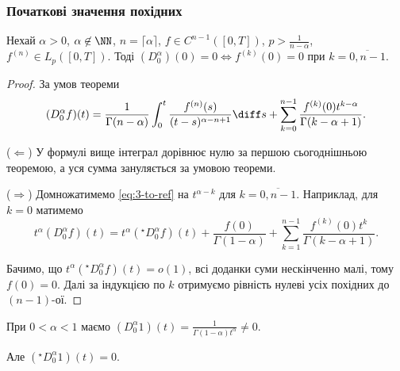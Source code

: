 \subsubsection{Початкові значення похідних}

\begin{theorem}
    Нехай $\alpha > 0$, $\alpha \not\in \NN$, $n = \lceil \alpha \rceil$, $f \in C^{n - 1}([0, T])$, $p > \frac{1}{n - \alpha}$, $f^{(n)} \in L_p([0, T])$. Тоді $(D_0^\alpha) (0) = 0 \iff f^{(k)} (0) = 0$ при $k = \overline{0, n - 1}$.
\end{theorem}

\begin{proof}
    За умов теореми
    \begin{equation}
        \label{eq:3-to-ref}
        (D_0^\alpha f)(t) = \frac{1}{\Gamma(n - \alpha)} \int_0^t \frac{f^{(n)}(s)}{(t - s)^{\alpha - n + 1}} \diff s + \sum_{k = 0}^{n - 1} \frac{f^{(k)}(0) t^{k - \alpha}}{\Gamma(k - \alpha + 1)}.
    \end{equation}

    ($\Longleftarrow$) У формулі вище інтеграл дорівнює нулю за першою сьогоднішньою теоремою, а уся сумма зануляється за умовою теореми. \medskip

    ($\Longrightarrow$) Домножатимемо \eqref{eq:3-to-ref} на $t^{\alpha - k}$ для $k = \overline{0, n - 1}$. Наприклад, для $k = 0$ матимемо
    \begin{equation}
        t^\alpha (D_0^\alpha f)(t) = t^\alpha ({}^\star D_0^\alpha f)(t) + \frac{f(0)}{\Gamma(1 - \alpha)} + \sum_{k = 1}^{n - 1} \frac{f^{(k)}(0) t^k}{\Gamma(k - \alpha + 1)}.
    \end{equation}

    Бачимо, що $t^\alpha ({}^\star D_0^\alpha f)(t) = o(1)$, всі доданки суми нескінченно малі, тому $f(0) = 0$. Далі за індукцією по $k$ отримуємо рівність нулеві усіх похідних до $(n-1)$-ої.
\end{proof}

\begin{remark}
    При $0 < \alpha < 1$ маємо $(D_0^\alpha 1)(t) = \frac{1}{\Gamma(1 - \alpha) t^\alpha} \ne 0$.
\end{remark}

\begin{remark}
    Але $({}^\star D_0^\alpha 1)(t) = 0$.
\end{remark}

